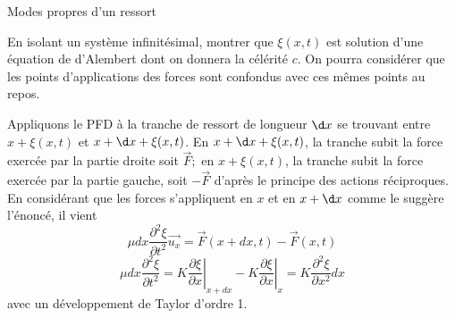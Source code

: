 \begin{exo}[PC][1][devoir]{Modes propres d'un ressort}
  
\begin{quest}
  \QR
  {En isolant un système infinitésimal, montrer que $\xi(x, t)$ est solution d'une équation de d'Alembert dont on donnera la célérité $c$. On pourra considérer que les points d'applications des forces sont confondus avec ces mêmes points au repos.}
  {
  Appliquons le PFD à la tranche de ressort de longueur $\d x$ se trouvant entre $x+\xi(x, t)$ et $x+\d x+\xi(x, t)$. En $x+\d x+\xi(x, t)$, la tranche subit la force exercée par la partie droite soit $\vec{F} ;$ en $x+\xi(x, t)$, la tranche subit la force exercée par la partie gauche, soit $-\vec{F}$ d'après le principe des actions réciproques. En considérant que les forces s'appliquent en $x$ et en $x+\d x$ comme le suggère l'énoncé, il vient
$$
\mu d x \frac{\partial^2 \xi}{\partial t^2} \overrightarrow{u_x}=\vec{F}(x+d x, t)-\vec{F}(x, t)
$$
$$
\mu d x \frac{\partial^2 \xi}{\partial t^2}=\left.K \frac{\partial \xi}{\partial x}\right|_{x+d x}-\left.K \frac{\partial \xi}{\partial x}\right|_x=K \frac{\partial^2 \xi}{\partial x^2} d x
$$
avec un développement de Taylor d'ordre 1.


}
\end{quest}
\end{exo}
